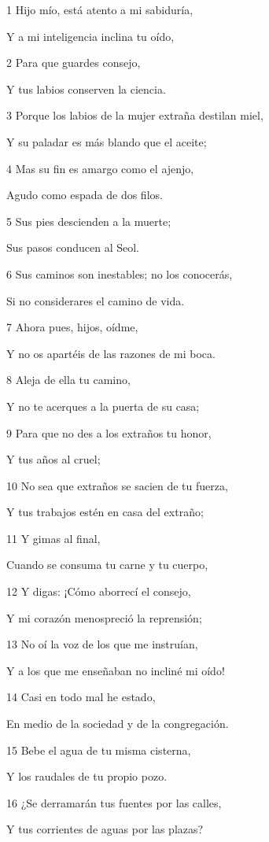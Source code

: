 \par 1 Hijo mío, está atento a mi sabiduría,
\par Y a mi inteligencia inclina tu oído,
\par 2 Para que guardes consejo,
\par Y tus labios conserven la ciencia.
\par 3 Porque los labios de la mujer extraña destilan miel,
\par Y su paladar es más blando que el aceite;
\par 4 Mas su fin es amargo como el ajenjo,
\par Agudo como espada de dos filos.
\par 5 Sus pies descienden a la muerte;
\par Sus pasos conducen al Seol.
\par 6 Sus caminos son inestables; no los conocerás,
\par Si no considerares el camino de vida.
\par 7 Ahora pues, hijos, oídme,
\par Y no os apartéis de las razones de mi boca.
\par 8 Aleja de ella tu camino,
\par Y no te acerques a la puerta de su casa;
\par 9 Para que no des a los extraños tu honor,
\par Y tus años al cruel;
\par 10 No sea que extraños se sacien de tu fuerza,
\par Y tus trabajos estén en casa del extraño;
\par 11 Y gimas al final,
\par Cuando se consuma tu carne y tu cuerpo,
\par 12 Y digas: ¡Cómo aborrecí el consejo,
\par Y mi corazón menospreció la reprensión;
\par 13 No oí la voz de los que me instruían,
\par Y a los que me enseñaban no incliné mi oído!
\par 14 Casi en todo mal he estado,
\par En medio de la sociedad y de la congregación.
\par 15 Bebe el agua de tu misma cisterna,
\par Y los raudales de tu propio pozo.
\par 16 ¿Se derramarán tus fuentes por las calles,
\par Y tus corrientes de aguas por las plazas?
